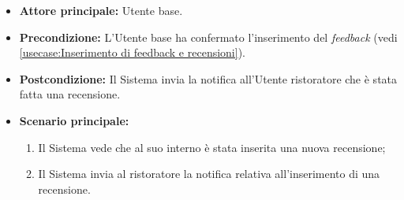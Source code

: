 \label{usecase:Notifica di inserimento feedback}
\begin{itemize}
	\item \textbf{Attore principale:} Utente base.
	
	\item \textbf{Precondizione:} L'Utente base ha confermato l'inserimento del \textit{feedback} (vedi \autoref{usecase:Inserimento di feedback e recensioni}).

	\item \textbf{Postcondizione:} Il Sistema invia la notifica all'Utente ristoratore che è stata fatta una recensione.
     
	\item \textbf{Scenario principale:}
	      \begin{enumerate}
                \item Il Sistema vede che al suo interno è stata inserita una nuova recensione;
                \item Il Sistema invia al ristoratore la notifica relativa all'inserimento di una recensione.
	      \end{enumerate}
\end{itemize}
